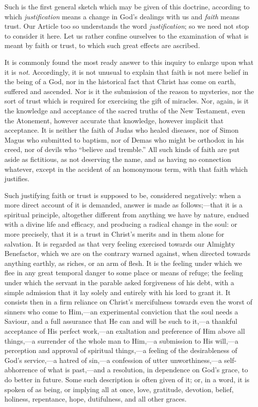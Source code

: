 Such is the first general sketch which may be given of this
doctrine, according to which \emph{justification} means a change
in God's dealings with us and \emph{faith} means trust. Our Article
too so understands the word \emph{justification}; so we need not stop
to consider it here. Let us rather confine ourselves to the
examination of what is meant by faith or trust, to which such great
effects are ascribed.

It is commonly found the most ready answer to this inquiry to
enlarge upon what it is \emph{not}. Accordingly, it is not unusual to
explain that faith is not mere belief in the being of a God, nor in
the historical fact that Christ has come on earth, suffered and
ascended. Nor is it the submission of the reason to mysteries, nor the
sort of trust which is required for exercising the gift of miracles.
Nor, again, is it the knowledge and acceptance of the sacred truths of
the New Testament, even the Atonement, however accurate that
knowledge, however implicit that acceptance. It is neither the faith
of Judas who healed diseases, nor of Simon Magus who submitted to
baptism, nor of Demas who might be orthodox in his creed, nor of
devils who ``believe and tremble.'' All such kinds of faith
are put aside as fictitious, as not deserving the name, and as having
no connection whatever, except in the accident of an homonymous term,
with that faith which justifies.

Such justifying faith or trust is supposed to be, considered
negatively: when a more direct account of it is demanded, answer is
made as follows;—that it is a spiritual principle, altogether
different from anything we have by nature, endued with a divine life
and efficacy, and producing a radical change in the soul: or more
precisely, that it is a trust in Christ's merits and in them alone for
salvation. It is regarded as that very feeling exercised towards
our Almighty Benefactor, which we are on the contrary warned against,
when directed towards anything earthly, as riches, or an arm of flesh.
It is the feeling under which we flee in any great temporal danger to
some place or means of refuge; the feeling under which the servant in
the parable asked forgiveness of his debt, with a simple admission
that it lay solely and entirely with his lord to grant it. It consists
then in a firm reliance on Christ's mercifulness towards even the
worst of sinners who come to Him,—an experimental conviction that
the soul needs a Saviour, and a full assurance that He can and will be
such to it,—a thankful acceptance of His perfect work,—an
exaltation and preference of Him above all things,—a surrender of
the whole man to Him,—a submission to His will,—a perception and
approval of spiritual things,—a feeling of the desirableness of
God's service,—a hatred of sin,—a confession of utter
unworthiness,—a self-abhorrence of what is past,—and a resolution,
in dependence on God's grace, to do better in future. Some such
description is often given of it; or, in a word, it is spoken of as
being, or implying all at once, love, gratitude, devotion, belief,
holiness, repentance, hope, dutifulness, and all other graces.

